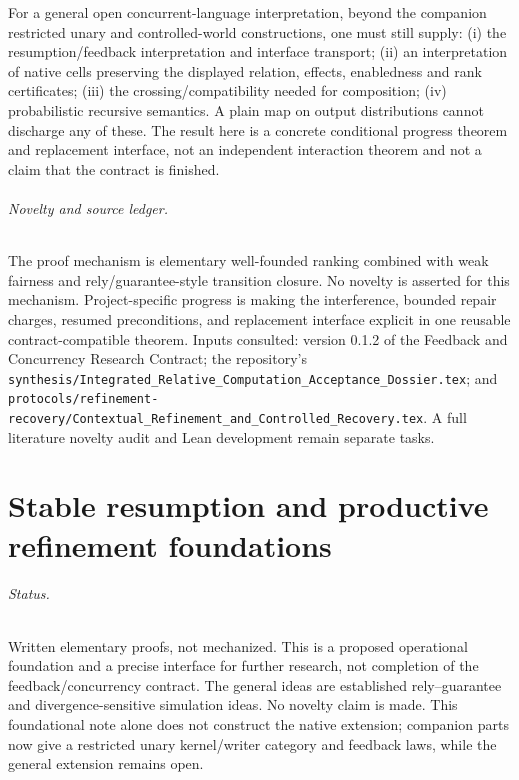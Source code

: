 \documentclass[11pt]{article}
\begin{document}
For a general open concurrent-language interpretation, beyond the companion restricted unary and controlled-world constructions, one must still supply: (i) the resumption/feedback interpretation and interface transport; (ii) an interpretation of native cells preserving the displayed relation, effects, enabledness and rank certificates; (iii) the crossing/compatibility needed for composition; (iv) probabilistic recursive semantics. A plain map on output distributions cannot discharge any of these. The result here is a concrete conditional progress theorem and replacement interface, not an independent interaction theorem and not a claim that the contract is finished.

\paragraph{Novelty and source ledger.} The proof mechanism is elementary well-founded ranking combined with weak fairness and rely/guarantee-style transition closure. No novelty is asserted for this mechanism. Project-specific progress is making the interference, bounded repair charges, resumed preconditions, and replacement interface explicit in one reusable contract-compatible theorem. Inputs consulted: version 0.1.2 of the Feedback and Concurrency Research Contract; the repository's \texttt{synthesis/Integrated\_Relative\_Computation\_Acceptance\_Dossier.tex}; and \texttt{protocols/refinement-recovery/Contextual\_Refinement\_and\_Controlled\_Recovery.tex}. A full literature novelty audit and Lean development remain separate tasks.


\part{Stable resumption and productive refinement foundations}

\paragraph{Status.} Written elementary proofs, not mechanized. This is a proposed operational foundation and a precise interface for further research, not completion of the feedback/concurrency contract. The general ideas are established rely--guarantee and divergence-sensitive simulation ideas. No novelty claim is made. This foundational note alone does not construct the native extension; companion parts now give a restricted unary kernel/writer category and feedback laws, while the general extension remains open.
\end{document}
